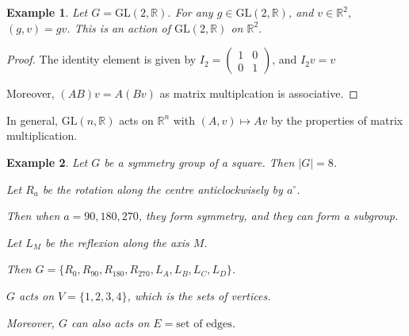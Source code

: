 \documentclass{article}
\theoremstyle{MyNonumberplain}
\theoremstyle{break}
\newtheorem*{proof}{Proof. }
\newcommand{\tmop}{\text}
\theoremstyle{break}
\newtheorem{example}{Example}[section]
\theoremstyle{break}
\theoremstyle{definition}
\theoremstyle{break}
\begin{document}
\begin{expbox}
    \begin{example}
        Let $G = \tmop{GL} (2, \mathbb{R})$. For any $g \in \tmop{GL} (2,
        \mathbb{R})$, and $v \in \mathbb{R}^2$, $(g, v) = g v$. This is an action of
        $\tmop{GL} (2, \mathbb{R})$ on $\mathbb{R}^2$.
    \end{example}
    \begin{prfbox}
        \begin{proof}
            The identity element is given by $I_2 = \left(\begin{array}{cc}
                1 & 0\\
                0 & 1
              \end{array}\right)$, and $I_2 v = v$
              
              Moreover, $(A B) v = A (B v)$ as matrix multiplcation is associative.
        \end{proof}
    \end{prfbox}
    In general, $\tmop{GL} (n, \mathbb{R})$ acts on $\mathbb{R}^n$ with $(A, v)
    \mapsto A v$ by the properties of matrix multiplication.
\end{expbox}

\begin{expbox}
    \begin{example}
        Let $G$ be a symmetry group of a square. Then $| G | = 8$.\bigskip

        Let $R_a$ be the rotation along the centre anticlockwisely by $a^{\circ}$.\bigskip

        Then when $a = 90, 180, 270$, they form symmetry, and they can form a
        subgroup.\bigskip

        Let $L_M$ be the reflexion along the axis $M$.\bigskip

        Then $G = \{ R_0, R_{90}, R_{180}, R_{270}, L_A, L_B, L_C, L_D \}$.\bigskip

        $G$ acts on $V = \{ 1, 2, 3, 4 \}$, which is the sets of vertices.\bigskip

        Moreover, $G$ can also acts on $E = \text{set of edges}$.
    \end{example}
\end{expbox}
\end{document}
